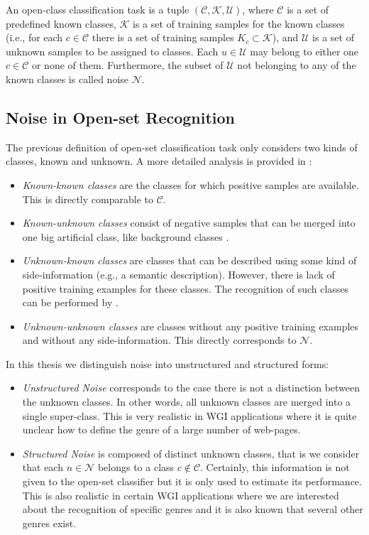 An open-class classification task is a tuple $(\mathcal{C},\mathcal{K},\mathcal{U})$, where $\mathcal{C}$ is a set of predefined known classes, $\mathcal{K}$ is a set of training samples for the known classes (i.e., for each $c \in \mathcal{C}$ there is a set of training samples $K_c \subset \mathcal{K}$), and $\mathcal{U}$ is a set of unknown samples to be assigned to classes. Each $u \in \mathcal{U}$ may belong to either one $c \in \mathcal{C}$ or none of them. Furthermore, the subset of $\mathcal{U}$ not belonging to any of the known classes is called noise $\mathcal{N}$.  

\subsection{Noise in Open-set Recognition}
\label{chap:openset:sec:Noise_definition}

The previous definition of open-set classification task only considers two kinds of classes, known and unknown. A more detailed analysis is provided in \parencite{geng2018recent}:

\begin{itemize}
    \item \textit{Known-known classes} are the classes for which positive samples are available. This is directly comparable to $\mathcal{C}$.
    \item \textit{Known-unknown classes} consist of negative samples that can be merged into one big artificial class, like background classes \parencite{dhamija2018reducing}.
    \item \textit{Unknown-known classes} are classes that can be described using some kind of side-information (e.g., a semantic description). However, there is lack of positive training examples for these classes. The recognition of such classes can be performed by  \parencite{palatucci2009zero}.
    \item \textit{Unknown-unknown classes} are classes without any positive training examples and without any side-information. This directly corresponds to $\mathcal{N}$. 
\end{itemize}

In this thesis we distinguish noise into unstructured and structured forms:

\begin{itemize}
    \item \textit{Unstructured Noise} corresponds to the case there is not a distinction between the unknown classes. In other words, all unknown classes are merged into a single super-class. This is very realistic in WGI applications where it is quite unclear how to define the genre of a large number of web-pages.
    \item \textit{Structured Noise} is composed of distinct unknown classes, that is we consider that each $n \in \mathcal{N}$ belongs to a class $c \notin \mathcal{C}$. Certainly, this information is not given to the open-set classifier but it is only used to estimate its performance. This is also realistic in certain WGI applications where we are interested about the recognition of specific genres and it is also known that several other genres exist.
\end{itemize}

